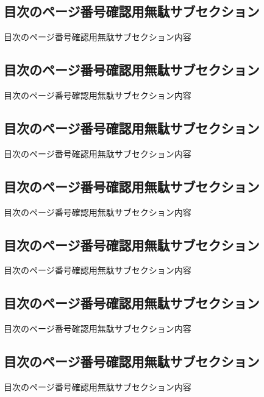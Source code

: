 \subsection{目次のページ番号確認用無駄サブセクション}
目次のページ番号確認用無駄サブセクション内容

\subsection{目次のページ番号確認用無駄サブセクション}
目次のページ番号確認用無駄サブセクション内容

\subsection{目次のページ番号確認用無駄サブセクション}
目次のページ番号確認用無駄サブセクション内容

\subsection{目次のページ番号確認用無駄サブセクション}
目次のページ番号確認用無駄サブセクション内容

\subsection{目次のページ番号確認用無駄サブセクション}
目次のページ番号確認用無駄サブセクション内容

\subsection{目次のページ番号確認用無駄サブセクション}
目次のページ番号確認用無駄サブセクション内容

\subsection{目次のページ番号確認用無駄サブセクション}
目次のページ番号確認用無駄サブセクション内容


